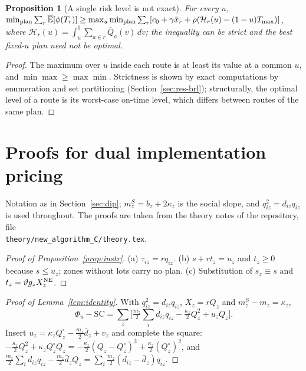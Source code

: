 \documentclass[preprint,11pt]{elsarticle}
\newtheorem{proposition}[theorem]{Proposition}
\theoremstyle{definition}
\theoremstyle{remark}
\newcommand{\Eu}{\overline{\mathbb{E}}}
\newcommand{\Qb}{\overline{Q}}
\newcommand{\xb}{\bar x}
\begin{document}
\begin{proposition}[A single risk level is not exact]\label{prop:fixedu}
For every $u$, $\min_{\rm plan}\sum_r\Eu[\phi(T_r)]\ge\max_u\min_{\rm plan}\sum_r[c_0+\gamma\xb_r+\rho(\mathcal H_r(u)-(1-u)T_{\max})]$, where $\mathcal H_r(u)=\int_u^1\sum_{a\in r}\Qb_a(v)\,dv$; the inequality can be strict and the best fixed-$u$ plan need not be optimal.
\end{proposition}
\begin{proof}
The maximum over $u$ inside each route is at least its value at a common $u$, and $\min\max\ge\max\min$. Strictness is shown by exact computations by enumeration and set partitioning (Section~\ref{sec:res-brl}); structurally, the optimal level of a route is its worst-case on-time level, which differs between routes of the same plan.
\end{proof}

\section{Proofs for dual implementation pricing}\label{app:dip}

Notation as in Section~\ref{sec:dip}; $m^S_z=b_z+2\kappa_z$ is the social slope, and $q_{iz}^2=d_{iz}q_{iz}$ is used throughout. The proofs are taken from the theory notes of the repository, file\\ \texttt{theory/new\_algorithm\_C/theory.tex}.

\begin{proof}[Proof of Proposition~\ref{prop:instr}]
(a) $\tau_{iz}=rq_{iz}$. (b) $s+rt_z=u_z$ and $t_z\ge0$ because $s\le u_z$; zones without lots carry no plan. (c) Substitution of $s_z\equiv s$ and $t_z=\vartheta g_zX^{\rm NE}_z$.
\end{proof}

\begin{proof}[Proof of Lemma~\ref{lem:identity}]
With $q_{iz}^2=d_{iz}q_{iz}$, $X_z=rQ_z$ and $m^S_z-m_z=\kappa_z$, \[\Phi_u-\mathrm{SC}=\sum_z\big[\tfrac{m_z}{2}\textstyle\sum_id_{iz}q_{iz}-\tfrac{\kappa_z}{2}Q_z^2+u_zQ_z\big].\] Insert $u_z=\kappa_zQ^\circ_z-\tfrac{m_z}{2}\bar d_z+v_z$ and complete the square: $-\tfrac{\kappa_z}{2}Q_z^2+\kappa_zQ^\circ_zQ_z=-\tfrac{\kappa_z}{2}(Q_z-Q^\circ_z)^2+\tfrac{\kappa_z}{2}(Q^\circ_z)^2$, and $\tfrac{m_z}{2}\sum_id_{iz}q_{iz}-\tfrac{m_z}{2}\bar d_zQ_z=\sum_i\tfrac{m_z}{2}(d_{iz}-\bar d_z)q_{iz}$.
\end{proof}
\end{document}
